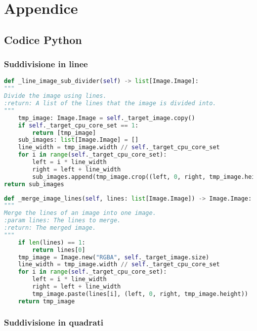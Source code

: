 \appendix
\chapter{Appendice}
\setcounter{secnumdepth}{0}
{\section{Codice Python}\label{appendix:image_subdivision}
	
\subsection{Suddivisione in linee}

{\begin{lstlisting}[language=Python, caption={Codice per la suddivisione in linee}, label={appendix:lines_subdivision}]
def _line_image_sub_divider(self) -> list[Image.Image]:
"""
Divide the image using lines.
:return: A list of the lines that the image is divided into.
"""
	tmp_image: Image.Image = self._target_image.copy()
	if self._target_cpu_core_set == 1:
		return [tmp_image]
	sub_images: list[Image.Image] = []
	line_width = tmp_image.width // self._target_cpu_core_set
	for i in range(self._target_cpu_core_set):
		left = i * line_width
		right = left + line_width
		sub_images.append(tmp_image.crop((left, 0, right, tmp_image.height)))
return sub_images
\end{lstlisting}}

{\begin{lstlisting}[language=Python, caption={Codice per l'unione delle linee}, label={appendix:lines_merge}]
def _merge_image_lines(self, lines: list[Image.Image]) -> Image.Image:
"""
Merge the lines of an image into one image.
:param lines: The lines to merge.
:return: The merged image.
"""
	if len(lines) == 1:
		return lines[0]
	tmp_image = Image.new("RGBA", self._target_image.size)
	line_width = tmp_image.width // self._target_cpu_core_set
	for i in range(self._target_cpu_core_set):
		left = i * line_width
		right = left + line_width
		tmp_image.paste(lines[i], (left, 0, right, tmp_image.height))
	return tmp_image
\end{lstlisting}}
\newpage
\subsection{Suddivisione in quadrati}

}
